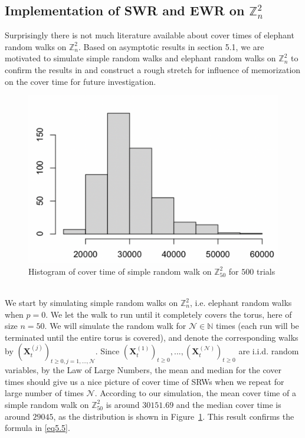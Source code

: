 \documentclass[
11pt, %
a4paper, %
oneside, %
headinclude,footinclude, %
BCOR5mm, %
]{scrartcl}
\begin{document}
\subsection{Implementation of SWR and EWR on $\mathbb{Z}_n^2$}
Surprisingly there is not much literature available about cover times of elephant random walks on $\mathbb{Z}_n^2$. Based on asymptotic results in section 5.1, we are motivated to simulate simple random walks and elephant random walks on $\mathbb{Z}_n^2$ to confirm the results in \cite{bercu2019multi} and construct a rough stretch for influence of memorization on the cover time for future investigation. 
\begin{figure}[htb]
    \centering
    \includegraphics[width=.75\columnwidth]{Figures/redo p = 0 500.png}
    \caption{Histogram of cover time of simple random walk on $\mathbb{Z}_{50}^2$ for $500$ trials}
    \label{500}
\end{figure}
\vspace{0.6em}\\We start by simulating simple random walks on $\mathbb{Z}_n^2$, i.e. elephant random walks when $p=0$. We let the walk to run until it completely covers the torus, here of size $n=50$. We will simulate the random walk for $\mathcal{N} \in \mathbb{N}$ times (each run will be terminated until the entire torus is covered), and denote the corresponding walks by $(\mathbf{X}_t^{(j)})_{t \geq 0, j = 1,..., \mathcal{N}}$. Since $(\mathbf{X}_t^{(1)})_{t \geq 0},...,(\mathbf{X}_t^{(\mathcal{N})})_{t \geq 0}$ are i.i.d. random variables, by the Law of Large Numbers, the mean and median for the cover times should give us a nice picture of cover time of SRWs when we repeat for large number of times $\mathcal{N}$. According to our simulation, the mean cover time of a simple random walk on $\mathbb{Z}_{50}^2$ is around $30151.69$ and the median cover time is around $29045$, as the distribution is shown in Figure~\ref{500}. This result confirms the formula in \eqref{eq5.5}.
\end{document}
